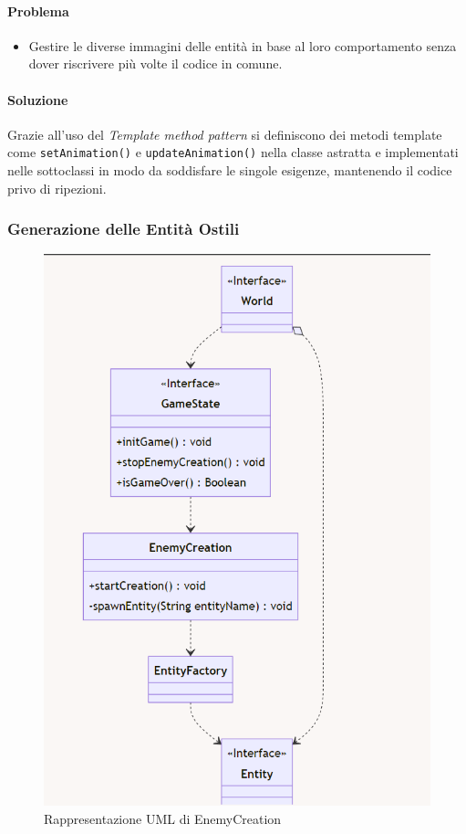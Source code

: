 \documentclass[a4paper,12pt]{report}
\begin{document}
\paragraph{Problema}
\begin{itemize}
    \item Gestire le diverse immagini delle entità in base al loro comportamento senza dover riscrivere più volte il codice in comune.
\end{itemize}
\paragraph{Soluzione}
Grazie all'uso del \textit{Template method pattern} si definiscono dei metodi template
come \texttt{setAnimation()} e \texttt{updateAnimation()} nella classe astratta e implementati nelle sottoclassi in modo da soddisfare le singole esigenze, mantenendo il codice privo di ripezioni.

\subsubsection{Generazione delle Entità Ostili}

\begin{figure}[H]
\centering{}
\includegraphics[width=\textwidth,keepaspectratio]{img/EnemyCreationUML.png}
\caption{Rappresentazione UML di EnemyCreation}
\end{figure}
\end{document}
